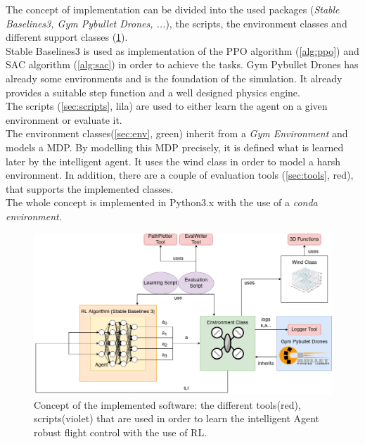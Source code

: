 The concept of implementation can be divided into the used packages (\emph{Stable Baselines3, Gym Pybullet Drones, ...}), the scripts, the environment classes and different support classes (\cref{fig:concept}).\\
Stable Baselines3 is used as implementation of the PPO algorithm (\cref{alg:ppo}) and SAC algorithm (\cref{alg:sac}) in order to achieve the tasks. Gym Pybullet Drones has already some environments and is the foundation of the simulation. It already provides a suitable step function and a well designed physics engine.\\
The scripts (\cref{sec:scripts}, lila) are used to either learn the agent on a given environment or evaluate it.\\
The environment classes(\cref{sec:env}, green) inherit from a \emph{Gym Environment} and models a MDP. By modelling this MDP precisely, it is defined what is learned later by the intelligent agent. It uses the wind class in order to model a harsh environment.
In addition, there are a couple of evaluation tools (\cref{sec:tools}, red), that supports the implemented classes.\\
\newline
The whole concept is implemented in Python3.x with the use of a \emph{conda environment}.

\begin{figure}[htp]
	\centering
	\includegraphics[width= \linewidth]{figures/concept.png}
	\caption{Concept of the implemented software: the different tools(red), scripts(violet) that are used in order to learn the intelligent Agent robust flight control with the use of RL.}
	\label{fig:concept}
\end{figure}
\newpage

